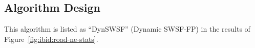 \subsection{Algorithm Design}


This algorithm is listed as ``DynSWSF''
(Dynamic SWSF-FP)
in the results of Figure~\ref{fig:ibid:road-ne-stats}.


%
%
%
%
%
%
%
